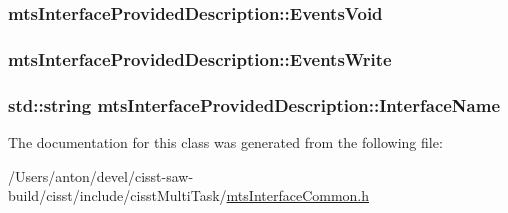 \subsubsection[{Events\+Void}]{ mts\+Interface\+Provided\+Description\+::\+Events\+Void}\label{classmts_interface_provided_description_ab929da8fee6a684c4bea9d4de67fd214}
\hypertarget{classmts_interface_provided_description_a676740e1b5728c67c10a76ac588d39aa}{}
\subsubsection[{Events\+Write}]{ mts\+Interface\+Provided\+Description\+::\+Events\+Write}\label{classmts_interface_provided_description_a676740e1b5728c67c10a76ac588d39aa}
\hypertarget{classmts_interface_provided_description_a9d0b2061eb25931296b5d0b55b7147c0}{}
\subsubsection[{Interface\+Name}]{\setlength{\rightskip}{0pt plus 5cm}std\+::string mts\+Interface\+Provided\+Description\+::\+Interface\+Name}\label{classmts_interface_provided_description_a9d0b2061eb25931296b5d0b55b7147c0}


The documentation for this class was generated from the following file\+:\begin{DoxyCompactItemize}
\item 
/\+Users/anton/devel/cisst-\/saw-\/build/cisst/include/cisst\+Multi\+Task/\hyperlink{mts_interface_common_8h}{mts\+Interface\+Common.\+h}\end{DoxyCompactItemize}
